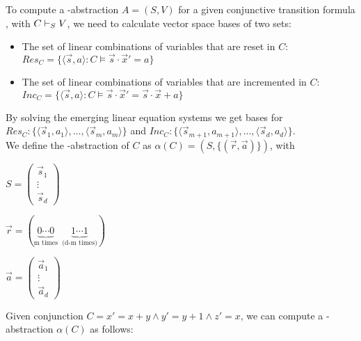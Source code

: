 To compute a \qvasr-abstraction $A = (S, V)$ for a given conjunctive transition formula \conjunctTF, with $C \vdash_{S} V$, we need to calculate vector space bases of two sets:
\begin{itemize}
 \item The set of linear combinations of variables that are reset in $C$: $Res_C = \{ \langle \vec{s}, a \rangle : C \models \vec{s} \cdot \vec{x}' = a \}$
 \item The set of linear combinations of variables that are incremented in $C$: $Inc_C = \{ \langle \vec{s}, a \rangle : C \models \vec{s} \cdot \vec{x}' = \vec{s} \cdot \vec{x} + a \}$
\end{itemize}
By solving the emerging linear equation systems we get bases for $Res_C: \{\langle \vec{s}_1, a_1 \rangle, \ldots, \langle \vec{s}_m, a_m \rangle\}$ and $Inc_C: \{ \langle \vec{s}_{m+1}, a_{m+1} \rangle , \ldots, \langle \vec{s}_d, a_d\rangle \}$. \\ We define the \qvasr-abstraction of $C$ as $\alpha(C) = (S, \{(\vec{r}, \vec{a})\})$, with \\

\begin{minipage}{0.3\textwidth}
\centering
    $ S = \begin{pmatrix}
            \vec{s}_1 \\
            \vdots \\
            \vec{s}_d
            \end{pmatrix}$
\end{minipage}
\begin{minipage}{0.3\textwidth}
\centering
$\vec{r} = (\underbrace{0 \cdots 0}_{\text{m times}} \ \ \underbrace{1 \cdots 1}_{\text{(d-m times)}})$
\end{minipage}
\begin{minipage}{0.3\textwidth}
\centering
$\vec{a} = \begin{pmatrix}
            \vec{a}_1 \\
            \vdots \\
            \vec{a}_d
            \end{pmatrix}$
\end{minipage}

\begin{example}
Given conjunction $C = x' = x+ y \land y' = y+ 1 \land z' = x$, we can compute a \qvasr-abstraction $\alpha(C)$ as follows: \\

\end{example}

